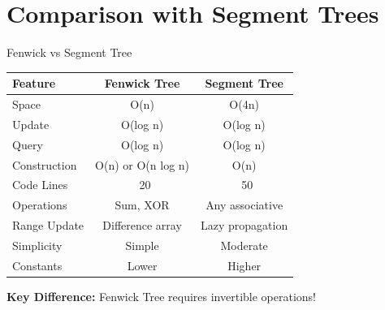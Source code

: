 \documentclass[aspectratio=169]{beamer}
\begin{document}
\section{Comparison with Segment Trees}

\begin{frame}{Fenwick vs Segment Tree}
  \begin{table}
    \centering
    \small
    \begin{tabular}{|l|c|c|}
      \hline
      \textbf{Feature} & \textbf{Fenwick Tree} & \textbf{Segment Tree} \\
      \hline
      Space & O(n) & O(4n) \\
      \hline
      Update & O(log n) & O(log n) \\
      \hline
      Query & O(log n) & O(log n) \\
      \hline
      Construction & O(n) or O(n log n) & O(n) \\
      \hline
      Code Lines & ~20 & ~50 \\
      \hline
      Operations & Sum, XOR & Any associative \\
      \hline
      Range Update & Difference array & Lazy propagation \\
      \hline
      Simplicity & Simple & Moderate \\
      \hline
      Constants & Lower & Higher \\
      \hline
    \end{tabular}
  \end{table}

  \vspace{0.5cm}
  \textbf{Key Difference:} Fenwick Tree requires invertible operations!
\end{frame}
\end{document}
